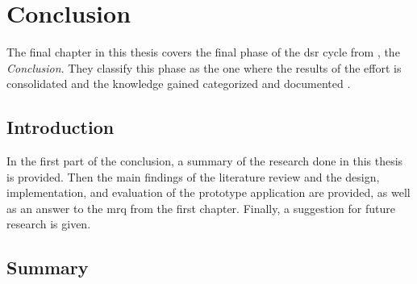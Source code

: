 
\chapter{Conclusion}

\label{ChapterConclusion}

The final chapter in this thesis covers the final phase of the \gls{dsr} cycle from \cite{Vaishnavi2008}, the \textit{Conclusion}. They classify this phase as the one where the results of the effort is consolidated and the knowledge gained categorized and documented \citep{Vaishnavi2008}.



\section{Introduction}

In the first part of the conclusion, a summary of the research done in this thesis is provided. Then the main findings of the literature review and the design, implementation, and evaluation of the prototype application are provided, as well as an answer to the \gls{mrq} from the first chapter. Finally, a suggestion for future research is given.



\section{Summary}

